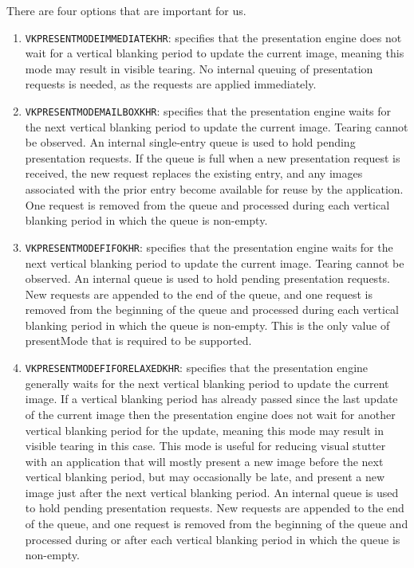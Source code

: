 \documentclass[12pt]{article}
\begin{document}
	There are four options that are important for us.
	
	\begin{enumerate}
		\item \texttt{VK\textunderscore{}PRESENT\textunderscore{}MODE\textunderscore{}IMMEDIATE\textunderscore{}KHR}: specifies that the presentation engine does not wait for a vertical blanking period to update the current image, meaning this mode may result in visible tearing. No internal queuing of presentation requests is needed, as the requests are applied immediately.
		
		\item \texttt{VK\textunderscore{}PRESENT\textunderscore{}MODE\textunderscore{}MAILBOX\textunderscore{}KHR}: specifies that the presentation engine waits for the next vertical blanking period to update the current image. Tearing cannot be observed. An internal single-entry queue is used to hold pending presentation requests. If the queue is full when a new presentation request is received, the new request replaces the existing entry, and any images associated with the prior entry become available for reuse by the application. One request is removed from the queue and processed during each vertical blanking period in which the queue is non-empty.
		
		\item \texttt{VK\textunderscore{}PRESENT\textunderscore{}MODE\textunderscore{}FIFO\textunderscore{}KHR}: specifies that the presentation engine waits for the next vertical blanking period to update the current image. Tearing cannot be observed. An internal queue is used to hold pending presentation requests. New requests are appended to the end of the queue, and one request is removed from the beginning of the queue and processed during each vertical blanking period in which the queue is non-empty. This is the only value of presentMode that is required to be supported.
		
		\item \texttt{VK\textunderscore{}PRESENT\textunderscore{}MODE\textunderscore{}FIFO\textunderscore{}RELAXED\textunderscore{}KHR}: specifies that the presentation engine generally waits for the next vertical blanking period to update the current image. If a vertical blanking period has already passed since the last update of the current image then the presentation engine does not wait for another vertical blanking period for the update, meaning this mode may result in visible tearing in this case. This mode is useful for reducing visual stutter with an application that will mostly present a new image before the next vertical blanking period, but may occasionally be late, and present a new image just after the next vertical blanking period. An internal queue is used to hold pending presentation requests. New requests are appended to the end of the queue, and one request is removed from the beginning of the queue and processed during or after each vertical blanking period in which the queue is non-empty.
		
	\end{enumerate}
	
\end{document}
